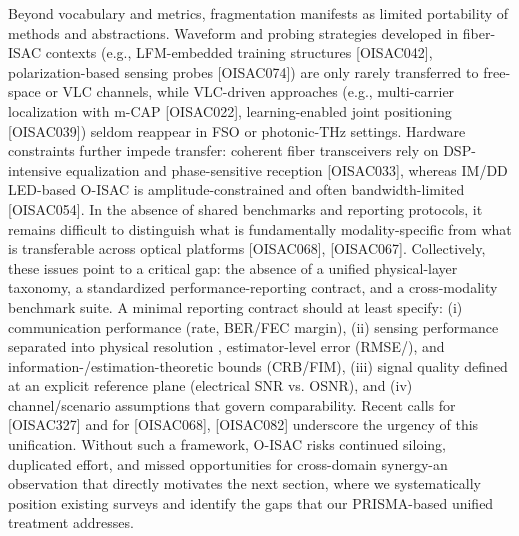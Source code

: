 {} Beyond vocabulary and metrics, fragmentation manifests as limited portability of methods and abstractions. Waveform and probing strategies developed in fiber-ISAC contexts (e.g., LFM-embedded training structures [O\markdownRendererUnderscore{}ISAC\markdownRendererUnderscore{}042], polarization-based sensing probes [O\markdownRendererUnderscore{}ISAC\markdownRendererUnderscore{}074]) are only rarely transferred to free-space or VLC channels, while VLC-driven approaches (e.g., multi-carrier localization with m-CAP [O\markdownRendererUnderscore{}ISAC\markdownRendererUnderscore{}022], learning-enabled joint positioning [O\markdownRendererUnderscore{}ISAC\markdownRendererUnderscore{}039]) seldom reappear in FSO or photonic-THz settings. Hardware constraints further impede transfer: coherent fiber transceivers rely on DSP-intensive equalization and phase-sensitive reception [O\markdownRendererUnderscore{}ISAC\markdownRendererUnderscore{}033], whereas IM/DD LED-based O-ISAC is amplitude-constrained and often bandwidth-limited [O\markdownRendererUnderscore{}ISAC\markdownRendererUnderscore{}054]. In the absence of shared benchmarks and reporting protocols, it remains difficult to distinguish what is fundamentally modality-specific from what is transferable across optical platforms [O\markdownRendererUnderscore{}ISAC\markdownRendererUnderscore{}068], [O\markdownRendererUnderscore{}ISAC\markdownRendererUnderscore{}067].\markdownRendererParagraphSeparator
{} Collectively, these issues point to a critical gap: the absence of a unified physical-layer taxonomy, a standardized performance-reporting contract, and a cross-modality benchmark suite. A minimal reporting contract should at least specify: (i) communication performance (rate, BER/FEC margin), (ii) sensing performance separated into physical resolution , estimator-level error (RMSE/), and information-/estimation-theoretic bounds (CRB/FIM), (iii) signal quality defined at an explicit reference plane (electrical SNR vs. OSNR), and (iv) channel/scenario assumptions that govern comparability. Recent calls for  [O\markdownRendererUnderscore{}ISAC\markdownRendererUnderscore{}327] and for  [O\markdownRendererUnderscore{}ISAC\markdownRendererUnderscore{}068], [O\markdownRendererUnderscore{}ISAC\markdownRendererUnderscore{}082] underscore the urgency of this unification. Without such a framework, O-ISAC risks continued siloing, duplicated effort, and missed opportunities for cross-domain synergy-an observation that directly motivates the next section, where we systematically position existing surveys and identify the gaps that our PRISMA-based unified treatment addresses.\markdownRendererInterblockSeparator
